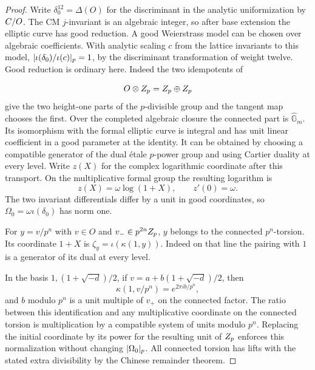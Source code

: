 \begin{proof}

Write \(\delta_0^{12}=\Delta(O)\) for the discriminant in
the analytic uniformization by \(C/O\). The CM \(j\)-invariant
is an algebraic integer, so after base extension the elliptic
curve has good reduction. A good Weierstrass model can be
chosen over algebraic coefficients. With analytic scaling
\(c\) from the lattice invariants to this model,
\(\lvert\iota(\delta_0)/\iota(c)\rvert_p=1\), by the discriminant
transformation of weight twelve. Good reduction is ordinary
here. Indeed the two idempotents of

\[
  O\otimes Z_p=Z_p\oplus Z_p
\]
 give the two height-one
parts of the \(p\)-divisible group and the tangent map chooses
the first. Over the completed algebraic closure the connected
part is \(\widehat{\mathbb G}_m\). Its isomorphism with the
formal elliptic curve is integral and has unit linear
coefficient in a good parameter at the identity. It can be
obtained by choosing a compatible generator of the dual
\'{e}tale \(p\)-power group and using Cartier duality at every
level. Write \(z(X)\) for the complex logarithmic coordinate after this transport. On the multiplicative formal group the resulting logarithm is
\[
  z(X)=\omega\log(1+X),\qquad z'(0)=\omega.
\]
 The two
invariant differentials differ by a unit in good coordinates,
so \(\Omega_0=\omega\iota(\delta_0)\) has norm one.
\cite{bannai-kobayashi-theta}\label{cor:word-measure-1}


For \(y=v/p^n\) with \(v\in O\) and
\(v_-\in p^{2n}Z_p\), \(y\) belongs to the connected
\(p^n\)-torsion. Its coordinate \(1+X\) is
\(\zeta_y=\iota(\kappa(1,y))\). Indeed on that line the pairing
with \(1\) is a generator of its dual at every level.

In the basis \(1,(1+\sqrt{-d})/2\), if \(v=a+b(1+\sqrt{-d})/2\),
then 
\[
  \kappa(1,v/p^n)=e^{2\pi i b/p^n},
\]
 and \(b\) modulo
\(p^n\) is a unit multiple of \(v_+\) on the connected factor.
The ratio between this identification and any multiplicative
coordinate on the connected torsion is multiplication by a
compatible system of units modulo \(p^n\). Replacing the
initial coordinate by its power for the resulting unit of
\(Z_p\) enforces this normalization without changing
\(\lvert\Omega_0\rvert_p\). All connected torsion has lifts with the
stated extra divisibility by the Chinese remainder theorem.

\end{proof}

